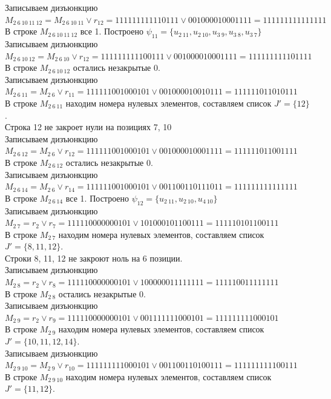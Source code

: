 \documentclass[a4paper,12pt]{article}
\begin{document}
Записываем дизъюнкцию $M_{2\ 6\ 10\ 11\ 12} = M_{2\ 6\ 10\ 11}\lor r_{12} = 111111111110111 \lor 001000010001111 = 111111111111111$\\
В строке $M_{2\ 6\ 10\ 11\ 12}$ все 1. Построено $\psi_{11} = \{u_{2\ 11},u_{2\ 10},u_{3\ 9},u_{3\ 8},u_{3\ 7}\}$\\
Записываем дизъюнкцию $M_{2\ 6\ 10\ 12} = M_{2\ 6\ 10}\lor r_{12} = 111111111100111 \lor 001000010001111 = 111111111101111$\\
В строке $M_{2\ 6\ 10\ 12}$ остались незакрытые 0.\\
Записываем дизъюнкцию $M_{2\ 6\ 11} = M_{2\ 6}\lor r_{11} = 111111001000101 \lor 001000010010111 = 111111011010111$\\
В строке $M_{2\ 6\ 11}$ находим номера нулевых элементов, составляем список $J' = \{12\}$.\\
Строка 12 не закроет нули на позициях 7, 10\\
Записываем дизъюнкцию $M_{2\ 6\ 12} = M_{2\ 6}\lor r_{12} = 111111001000101 \lor 001000010001111 = 111111011001111$\\
В строке $M_{2\ 6\ 12}$ остались незакрытые 0.\\
Записываем дизъюнкцию $M_{2\ 6\ 14} = M_{2\ 6}\lor r_{14} = 111111001000101 \lor 001100110111011 = 111111111111111$\\
В строке $M_{2\ 6\ 14}$ все 1. Построено $\psi_{12} = \{u_{2\ 11},u_{2\ 10},u_{4\ 10}\}$\\
Записываем дизъюнкцию $M_{2\ 7} = r_{2}\lor r_{7} = 111110000000101 \lor 101000101100111 = 111110101100111$\\
В строке $M_{2\ 7}$ находим номера нулевых элементов, составляем список $J' = \{8, 11, 12\}$.\\
Строки 8, 11, 12 не закроют ноль на 6 позиции.\\
Записываем дизъюнкцию $M_{2\ 8} = r_{2}\lor r_{8} = 111110000000101 \lor 100000011111111 = 111110011111111$\\
В строке $M_{2\ 8}$ остались незакрытые 0.\\
Записываем дизъюнкцию $M_{2\ 9} = r_{2}\lor r_{9} = 111110000000101 \lor 001111111000101 = 111111111000101$\\
В строке $M_{2\ 9}$ находим номера нулевых элементов, составляем список $J' = \{10, 11, 12, 14\}$.\\
Записываем дизъюнкцию $M_{2\ 9\ 10} = M_{2\ 9}\lor r_{10} = 111111111000101 \lor 001100110100111 = 111111111100111$\\
В строке $M_{2\ 9\ 10}$ находим номера нулевых элементов, составляем список $J' = \{11, 12\}$.\\
\end{document}
